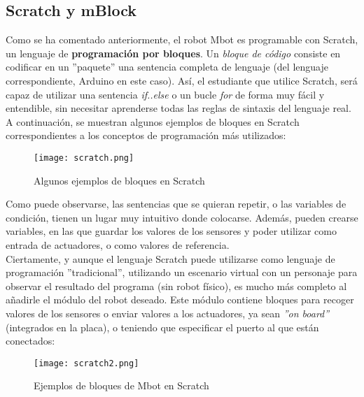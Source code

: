 \subsection{Scratch y mBlock}\label{subsec:scratch}
Como se ha comentado anteriormente, el robot Mbot es programable con Scratch, un lenguaje de \textbf{programación por bloques}. Un \textit{bloque de código} consiste en codificar en un ''paquete'' una sentencia completa de lenguaje (del lenguaje correspondiente, Arduino en este caso). Así, el estudiante que utilice Scratch, será capaz de utilizar una sentencia \textit{if..else} o un bucle \textit{for} de forma muy fácil y entendible, sin necesitar aprenderse todas las reglas de sintaxis del lenguaje real. A continuación, se muestran algunos ejemplos de bloques en Scratch correspondientes a los conceptos de programación más utilizados:
\begin{figure}[H]
	\texttt{[image: scratch.png]}
	\centering
	\label{img:scratch}
	\caption{Algunos ejemplos de bloques en Scratch}
\end{figure}
Como puede observarse, las sentencias que se quieran repetir, o las variables de condición, tienen un lugar muy intuitivo donde colocarse. Además, pueden crearse variables, en las que guardar los valores de los sensores y poder utilizar como entrada de actuadores, o como valores de referencia. \\
Ciertamente, y aunque el lenguaje Scratch puede utilizarse como lenguaje de programación ''tradicional'', utilizando un escenario virtual con un personaje para observar el resultado del programa (sin robot físico), es mucho más completo al añadirle el módulo del robot deseado. Este módulo contiene bloques para recoger valores de los sensores o enviar valores a los actuadores, ya sean \textit{''on board''} (integrados en la placa), o teniendo que especificar el puerto al que están conectados:
\begin{figure}[H]
	\texttt{[image: scratch2.png]}
	\centering
	\label{img:scratch2}
	\caption{Ejemplos de bloques de Mbot en Scratch}
\end{figure}

